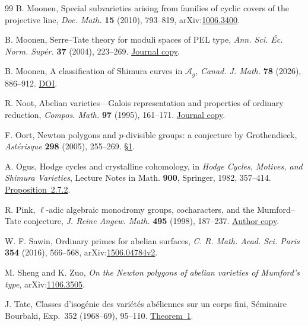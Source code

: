 \documentclass[11pt]{article}
\theoremstyle{definition}
\begin{document}
\begin{thebibliography}{99}
B. Moonen, Special subvarieties arising from families of cyclic covers
of the projective line, \emph{Doc. Math.} \textbf{15} (2010), 793--819,
arXiv:\href{https://arxiv.org/abs/1006.3400}{1006.3400}.

B. Moonen, Serre--Tate theory for moduli spaces of PEL type,
\emph{Ann. Sci. \'Ec. Norm. Sup\'er.} \textbf{37} (2004), 223--269.
\href{https://www.numdam.org/item/ASENS_2004_4_37_2_223_0/}{Journal copy}.

B. Moonen, A classification of Shimura curves in \(\mathcal A_g\),
\emph{Canad. J. Math.} \textbf{78} (2026), 886--912.
\href{https://doi.org/10.4153/S0008414X24001159}{DOI}.

R. Noot, Abelian varieties---Galois representation and properties of
ordinary reduction, \emph{Compos. Math.} \textbf{97} (1995), 161--171.
\href{https://www.numdam.org/item/CM_1995__97_1-2_161_0/}{Journal copy}.

F. Oort, Newton polygons and \(p\)-divisible groups: a conjecture by Grothendieck,
\emph{Ast\'erisque} \textbf{298} (2005), 255--269.
\href{https://www.numdam.org/item/AST_2005__298__255_0/}{\S1}.

A. Ogus, Hodge cycles and crystalline cohomology, in
\emph{Hodge Cycles, Motives, and Shimura Varieties}, Lecture Notes in
Math. \textbf{900}, Springer, 1982, 357--414.
\href{https://publications.ias.edu/sites/default/files/Number45.pdf#page=376}{Proposition~2.7.2}.

R. Pink, \(\ell\)-adic algebraic monodromy groups, cocharacters,
and the Mumford--Tate conjecture,
\emph{J. Reine Angew. Math.} \textbf{495} (1998), 187--237.
\href{https://people.math.ethz.ch/~pinkri/ftp/AMT-v3.pdf}{Author copy}.

W. F. Sawin, Ordinary primes for abelian surfaces,
\emph{C. R. Math. Acad. Sci. Paris} \textbf{354} (2016), 566--568,
arXiv:\href{https://arxiv.org/abs/1506.04784v2}{1506.04784v2}.

M. Sheng and K. Zuo, \emph{On the Newton polygons of abelian varieties
of Mumford's type}, arXiv:\href{https://arxiv.org/abs/1106.3505}{1106.3505}.

J. Tate, Classes d'isog\'enie des vari\'et\'es ab\'eliennes sur un
corps fini, S\'eminaire Bourbaki, Exp.~352 (1968--69), 95--110.
\href{https://numdam.org/item/SB_1968-1969__11__95_0/}{Theorem~1}.


\end{thebibliography}
\end{document}

